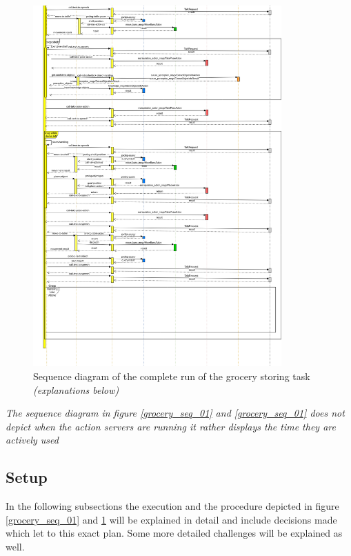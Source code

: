\documentclass[main.tex]{subfiles}
\begin{document}
		\begin{figure}	
			\centering
			\includegraphics[width=0.85\textwidth]{pictures/diagramms/second-part-grocery-sequence.png}
			\caption{Sequence diagram of the complete run of the grocery storing task \textit{(explanations below)}}
			\label{grocery_seq_02}
		\end{figure}
		\textit{The sequence diagram in figure \ref{grocery_seq_01} and \ref{grocery_seq_01} does not depict when the action servers are running it rather displays the time they are actively used}
	
	\subsection{Setup}
		
	
	In the following subsections the execution and the procedure depicted in figure \ref{grocery_seq_01} and \ref{grocery_seq_02} will be explained in detail and include decisions made which let to this exact plan. Some more detailed challenges will be explained as well.
\end{document}
